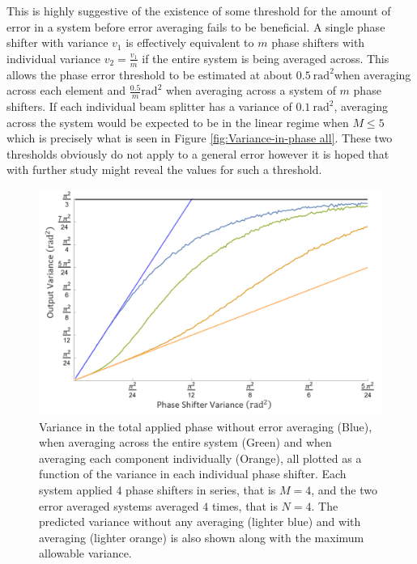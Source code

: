\documentclass[aps,pra,twocolumn,superscriptaddress,numerical]{revtex4-1}
\begin{document}
			This is highly suggestive of the existence of some threshold for the amount of error in a system before error averaging fails to be beneficial. A single phase shifter with variance $v_{1}$ is effectively equivalent to $m$ phase shifters with individual variance $v_{2}=\frac{v_{1}}{m}$ if the entire system is being averaged across. This allows the phase error threshold to be estimated at about $0.5\ \textrm{rad}^{2}$when averaging across each element and $\frac{0.5}{m}\textrm{rad}^{2}$ when averaging across a system of $m$ phase shifters. If each individual beam splitter has a variance of $0.1\ \textrm{rad}^{2}$, averaging across the system would be expected to be in the linear regime when $M\le5$ which is precisely what is seen in Figure \ref{fig:Variance-in-phase all}. These two thresholds obviously do not apply to a general error however it is hoped that with further study might reveal the values for such a threshold.
			
			\begin{figure}
				\begin{centering}
					\includegraphics[width=\columnwidth]{variance(variance).png}
					\par\end{centering}
				
				\caption[Variance of the total applied phase as a function of the number of	individual component variance. ]{Variance in the total applied phase without error averaging (Blue), when averaging across the entire system (Green) and when averaging each component individually (Orange), all plotted as a function of the variance in each individual phase shifter. Each system applied $4$ phase shifters in series, that is $M=4$, and the two error averaged systems averaged $4$ times, that is $N=4$. The predicted variance without any averaging (lighter blue) and with averaging (lighter orange) is also shown along with the maximum allowable variance. \label{fig:Variance(veriance)}}
				
				
			\end{figure}
			
\end{document}
